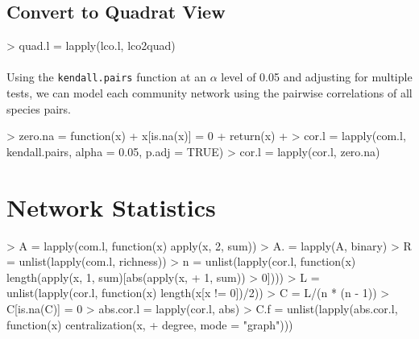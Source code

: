 \documentclass[11pt]{amsart}
\begin{document}
\subsection{Convert to Quadrat View}

\begin{Schunk}
\begin{Sinput}
> quad.l = lapply(lco.l, lco2quad)
\end{Sinput}
\end{Schunk}

\paragraph{}Using the \texttt{kendall.pairs} function at an $\alpha$
level of 0.05 and adjusting for multiple tests, we can model each
community network using the pairwise correlations of all species pairs.

\begin{Schunk}
\begin{Sinput}
> zero.na = function(x) {
+     x[is.na(x)] = 0
+     return(x)
+ }
> cor.l = lapply(com.l, kendall.pairs, alpha = 0.05, p.adj = TRUE)
> cor.l = lapply(cor.l, zero.na)
\end{Sinput}
\end{Schunk}

\section{Network Statistics}

\begin{Schunk}
\begin{Sinput}
> A = lapply(com.l, function(x) apply(x, 2, sum))
> A. = lapply(A, binary)
> R = unlist(lapply(com.l, richness))
> n = unlist(lapply(cor.l, function(x) length(apply(x, 1, sum)[abs(apply(x, 
+     1, sum)) > 0])))
> L = unlist(lapply(cor.l, function(x) length(x[x != 0])/2))
> C = L/(n * (n - 1))
> C[is.na(C)] = 0
> abs.cor.l = lapply(cor.l, abs)
> C.f = unlist(lapply(abs.cor.l, function(x) centralization(x, 
+     degree, mode = "graph")))
\end{Sinput}
\end{Schunk}


\end{document}
